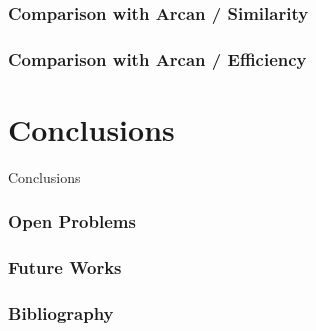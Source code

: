 \documentclass[dvipsnames, 10pt]{beamer}
\begin{document}
\begin{frame}
  \frametitle{Comparison with Arcan / Similarity}
\end{frame}

\begin{frame}
  \frametitle{Comparison with Arcan / Efficiency}
\end{frame}

\section{Conclusions}
\begin{frame}
  \centering
  \Huge
  Conclusions
\end{frame}

\begin{frame}
  \frametitle{Open Problems}
\end{frame}

\begin{frame}
  \frametitle{Future Works}
\end{frame}

\begin{frame}
\frametitle{Bibliography}
\printbibliography
\nocite{*}
\end{frame}
\end{document}
